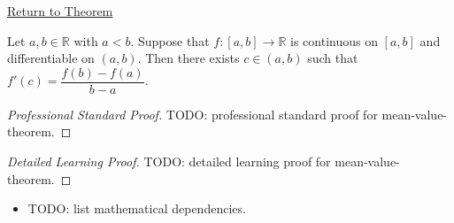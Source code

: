 \newpage
{}
\label{prf:mean-value-theorem}

\begin{remark*}[Return]
\hyperref[thm:mean-value-theorem]{Return to Theorem}
\end{remark*}

\begin{theorem*}
Let $a, b \in \mathbb{R}$ with $a < b$. Suppose that $f : [a,b] \to \mathbb{R}$ is continuous on $[a,b]$ and differentiable on $(a,b)$. Then there exists $c \in (a,b)$ such that $f'(c) = \dfrac{f(b)-f(a)}{b-a}$.
\end{theorem*}

\begin{proof}[Professional Standard Proof]
\LRAProofBodyStart
TODO: professional standard proof for mean-value-theorem.
\end{proof}

\begin{proof}[Detailed Learning Proof]
\LRAProofBodyStart
TODO: detailed learning proof for mean-value-theorem.
\end{proof}

\begin{remark*}
\end{remark*}

\begin{dependencies}
\begin{itemize}
  \item TODO: list mathematical dependencies.
\end{itemize}
\end{dependencies}

\clearpage
